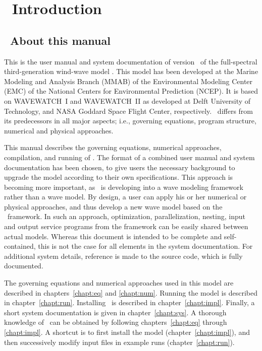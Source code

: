\section{~Introduction}
\vssub
\subsection{~About this manual}
\vssub

This is the user manual and system documentation of version \WWver\ of the
full-spectral third-generation wind-wave model \ww. This model has been
developed at the Marine Modeling and Analysis Branch (MMAB) of the
Environmental Modeling Center (EMC) of the National Centers for Environmental
Prediction (NCEP). It is based on WAVEWATCH~I and WAVEWATCH~II as developed at
Delft University of Technology, and NASA Goddard Space Flight Center,
respectively. \ws\ differs from its predecessors in all major aspects; i.e.,
governing equations, program structure, numerical and physical
approaches. %

This manual describes the governing equations, numerical approaches,
compilation, and running of \ws. The format of a combined user manual and
system documentation has been chosen, to give users the necessary background
to upgrade the model according to their own specifications.  This approach is
becoming more important, as \ws\ is developing into a wave modeling framework
rather than a wave model. By design, a user can apply his or her numerical or
physical approaches, and thus develop a new wave model based on the \ws\
framework. In such an approach, optimization, parallelization, nesting, input
and output service programs from the framework can be easily shared between
actual models.  Whereas this document is intended to be complete and
self-contained, this is not the case for all elements in the system
documentation. For additional system details, reference is made to the source
code, which is fully documented.

The governing equations and numerical approaches used in this model are
described in chapters~\ref{chapt:eq} and \ref{chapt:num}. Running the model is
described in chapter~\ref{chapt:run}. Installing \ws\ is described in
chapter~\ref{chapt:impl}. Finally, a short system documentation is given in
chapter~\ref{chapt:sys}. A thorough knowledge of \ws\ can be obtained by
following chapters~\ref{chapt:eq} through \ref{chapt:impl}. A shortcut is to
first install the model (chapter~\ref{chapt:impl}), and then successively
modify input files in example runs (chapter~\ref{chapt:run}).

